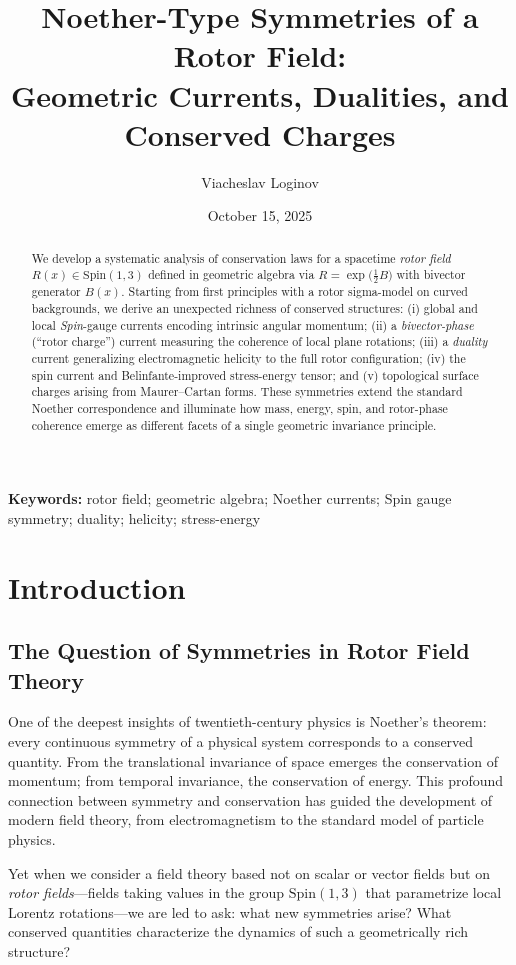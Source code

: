 \documentclass[11pt,a4paper]{article}
\title{Noether-Type Symmetries of a Rotor Field:\\
Geometric Currents, Dualities, and Conserved Charges}
\author[1]{Viacheslav Loginov}
\affil[1]{Kyiv, Ukraine\\ \texttt{barthez.slavik@gmail.com}}
\date{October 15, 2025}
\numberwithin{equation}{section}
\theoremstyle{plain}
\theoremstyle{definition}
\theoremstyle{remark}
\newcommand{\keywords}{\textbf{Keywords:} rotor field; geometric algebra; Noether currents; Spin gauge symmetry; duality; helicity; stress-energy}
\begin{document}
\maketitle

\begin{abstract}
We develop a systematic analysis of conservation laws for a spacetime \emph{rotor field} $R(x)\in \mathrm{Spin}(1,3)$ defined in geometric algebra via $R=\exp\!\big(\tfrac{1}{2}B\big)$ with bivector generator $B(x)$. Starting from first principles with a rotor sigma-model on curved backgrounds, we derive an unexpected richness of conserved structures: (i) global and local \emph{Spin}-gauge currents encoding intrinsic angular momentum; (ii) a \emph{bivector-phase} (``rotor charge'') current measuring the coherence of local plane rotations; (iii) a \emph{duality} current generalizing electromagnetic helicity to the full rotor configuration; (iv) the spin current and Belinfante-improved stress-energy tensor; and (v) topological surface charges arising from Maurer--Cartan forms. These symmetries extend the standard Noether correspondence and illuminate how mass, energy, spin, and rotor-phase coherence emerge as different facets of a single geometric invariance principle.
\end{abstract}

\keywords

\section{Introduction}
\label{sec:intro}

\subsection{The Question of Symmetries in Rotor Field Theory}

One of the deepest insights of twentieth-century physics is Noether's theorem: every continuous symmetry of a physical system corresponds to a conserved quantity. From the translational invariance of space emerges the conservation of momentum; from temporal invariance, the conservation of energy. This profound connection between symmetry and conservation has guided the development of modern field theory, from electromagnetism to the standard model of particle physics.

Yet when we consider a field theory based not on scalar or vector fields but on \emph{rotor fields}---fields taking values in the group $\mathrm{Spin}(1,3)$ that parametrize local Lorentz rotations---we are led to ask: what new symmetries arise? What conserved quantities characterize the dynamics of such a geometrically rich structure?
\end{document}
